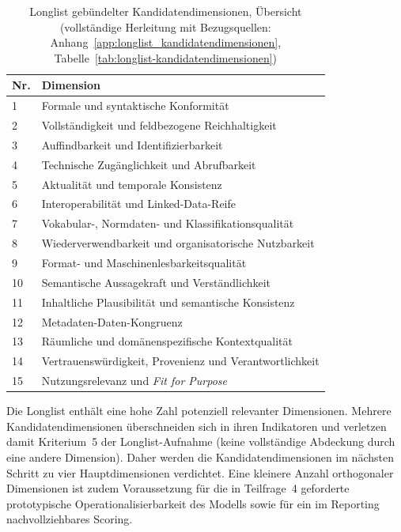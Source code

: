 \begin{table}[H]
\centering
\scriptsize
\renewcommand{\arraystretch}{1.1}
\begin{tabularx}{\textwidth}{p{0.7cm} X}
\hline
\textbf{Nr.} & \textbf{Dimension} \\
\hline
1 & Formale und syntaktische Konformität \\ \hline
2 & Vollständigkeit und feldbezogene Reichhaltigkeit \\ \hline
3 & Auffindbarkeit und Identifizierbarkeit \\ \hline
4 & Technische Zugänglichkeit und Abrufbarkeit \\ \hline
5 & Aktualität und temporale Konsistenz \\ \hline
6 & Interoperabilität und Linked-Data-Reife \\ \hline
7 & Vokabular-, Normdaten- und Klassifikationsqualität \\ \hline
8 & Wiederverwendbarkeit und organisatorische Nutzbarkeit \\ \hline
9 & Format- und Maschinenlesbarkeitsqualität \\ \hline
10 & Semantische Aussagekraft und Verständlichkeit \\ \hline
11 & Inhaltliche Plausibilität und semantische Konsistenz \\ \hline
12 & Metadaten-Daten-Kongruenz \\ \hline
13 & Räumliche und domänenspezifische Kontextqualität \\ \hline
14 & Vertrauenswürdigkeit, Provenienz und Verantwortlichkeit \\ \hline
15 & Nutzungsrelevanz und \textit{Fit for Purpose} \\ \hline
\end{tabularx}
\caption{Longlist gebündelter Kandidatendimensionen, Übersicht (vollständige Herleitung mit Bezugsquellen: Anhang~\ref{app:longlist_kandidatendimensionen}, Tabelle~\ref{tab:longlist-kandidatendimensionen})}
\label{tab:longlist-uebersicht}
\end{table}

Die Longlist enthält eine hohe Zahl potenziell relevanter Dimensionen. Mehrere Kandidatendimensionen überschneiden sich in ihren Indikatoren und verletzen damit Kriterium~5 der Longlist-Aufnahme (keine vollständige Abdeckung durch eine andere Dimension). Daher werden die Kandidatendimensionen im nächsten Schritt zu vier Hauptdimensionen verdichtet. Eine kleinere Anzahl orthogonaler Dimensionen ist zudem Voraussetzung für die in Teilfrage~4 geforderte prototypische Operationalisierbarkeit des Modells sowie für ein im Reporting nachvollziehbares Scoring.

